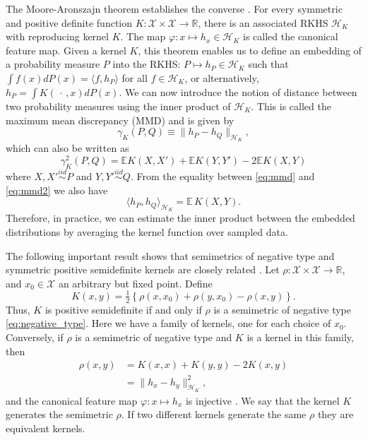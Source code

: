 \documentclass[aps,preprint,nofootinbib,floatfix]{revtex4-1}
\newcommand\E{\mathbb{E}}
\newcommand\kk{K}
\newcommand\kkk{h}
\newcommand\Hk{{\mathcal{H}}_{\kk}}
\begin{document}
The Moore-Aronszajn theorem establishes the converse \cite{Aronszajn}.
For every symmetric
and positive definite function $\kk: \mathcal{X}\times \mathcal{X} \to
\mathbb{R}$, there is an associated RKHS $\Hk$ 
with reproducing
kernel $\kk$. The map $\varphi: x \mapsto \kkk_x \in \Hk$ is called
the canonical feature map. Given a kernel $\kk$,
this theorem enables us to define an embedding of a probability measure
$P$ into the RKHS: $P \mapsto \kkk_P \in
\Hk$ such that 
$\int f(x) d P(x) = \langle f, \kkk_P \rangle$ for all $f \in \Hk$,
or alternatively, $\kkk_P = \int \kk( \, \cdot \,, x)  d P(x)$. 
We can now  introduce the 
notion of distance between two probability measures using the inner product
of $\Hk$. This is called the maximum mean discrepancy (MMD) and
is given by
\begin{equation}\label{eq:mmd}
\gamma_\kk(P,Q) \equiv \| \kkk_P - \kkk_Q \|_{\Hk},
\end{equation}
which can also be written as \cite{Gretton2012}
\begin{equation}\label{eq:mmd2}
\gamma_\kk^2(P,Q) = \E \kk(X,X') + \E \kk(Y,Y') - 2 \E \kk(X, Y)
\end{equation}
where $X,X' \stackrel{iid}{\sim} P$ and $Y,Y'\stackrel{iid}{\sim} Q$.
From the equality between \eqref{eq:mmd} and \eqref{eq:mmd2} we also
have 
\begin{equation}\label{eq:inner_data}
\langle \kkk_P, \kkk_Q \rangle_{\Hk} = \E \, \kk(X, Y).
\end{equation}
Therefore, in practice, we can estimate the inner product between the 
embedded distributions 
by averaging the kernel function over sampled data.

The following important result shows that semimetrics of negative
type and symmetric positive semidefinite kernels are closely related
\cite{Berg1984}. Let $\rho: \mathcal{X} \times \mathcal{X} \to \mathbb{R}$,
and $x_0 \in \mathcal{X}$ an arbitrary but fixed point.
Define
\begin{equation}
\label{eq:kernel_semimetric}
\kk(x,y) = \tfrac{1}{2} \left\{  \rho(x,x_0) + \rho(y,x_0) - \rho(x,y)\right\}.
\end{equation}
Thus, $\kk$ is positive semidefinite if and only if $\rho$ is a semimetric
of negative type
\eqref{eq:negative_type}.
Here we have a family of kernels, one for each choice of $x_0$. Conversely,
if $\rho$ is a semimetric of negative type and $\kk$ is a kernel in this
family, then 
\begin{equation}
\label{eq:gen_kernel}
\begin{split}
\rho(x,y) &= \kk(x,x) + \kk(y,y) -2\kk(x,y) \\
&=  \| \kkk_x - \kkk_y \|^2_{\Hk},
\end{split}
\end{equation}
and the canonical feature map 
$\varphi: x \mapsto \kkk_x$ is injective \cite{Sejdinovic2013}.
We say that the kernel $\kk$ generates the semimetric $\rho$. 
If two different kernels generate the same $\rho$ they are
equivalent kernels.
\end{document}
